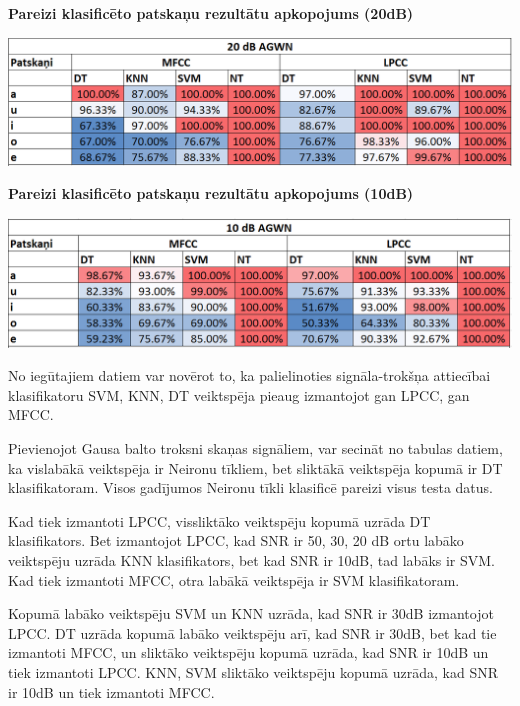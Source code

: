 \documentclass[12pt,paper=A4]{report}
\begin{document}
\begin{table}[H]
\caption{}
\captionsetup{justification=centering}
\caption*{\textbf{Pareizi klasificēto patskaņu rezultātu apkopojums (20dB)}}
\includegraphics[width=1.00\textwidth, left]{1confussion} 
\label{1confussion} 
\end{table}

\begin{table}[H]
\caption{}
\captionsetup{justification=centering}
\caption*{\textbf{Pareizi klasificēto patskaņu rezultātu apkopojums (10dB)}}
\includegraphics[width=1.00\textwidth, left]{3confussion} 
\label{3confussion} 
\end{table}

No iegūtajiem datiem var novērot to, ka palielinoties 
signāla-trokšņa attiecībai klasifikatoru SVM, KNN, DT 
veiktspēja pieaug izmantojot gan LPCC, gan MFCC.

Pievienojot Gausa balto troksni skaņas signāliem, var secināt 
no tabulas datiem, ka vislabākā veiktspēja ir Neironu tīkliem,
bet sliktākā veiktspēja kopumā ir DT klasifikatoram.
Visos gadījumos Neironu tīkli klasificē pareizi visus testa datus.

Kad tiek izmantoti LPCC, vissliktāko veiktspēju kopumā uzrāda DT klasifikators.
Bet izmantojot LPCC, kad SNR ir 50, 30, 20 dB ortu labāko 
veiktspēju uzrāda KNN klasifikators, bet kad SNR ir 10dB, tad labāks ir SVM. 
Kad tiek izmantoti MFCC, otra labākā veiktspēja ir SVM klasifikatoram.

Kopumā labāko veiktspēju SVM un KNN uzrāda, kad SNR ir 30dB izmantojot LPCC.
DT uzrāda kopumā labāko veiktspēju arī, kad SNR ir 30dB, bet
kad tie izmantoti MFCC, un sliktāko veiktspēju kopumā uzrāda, 
kad SNR ir 10dB un tiek izmantoti LPCC. KNN, SVM sliktāko 
veiktspēju kopumā uzrāda, kad SNR ir 10dB un tiek izmantoti MFCC. 
\end{document}
